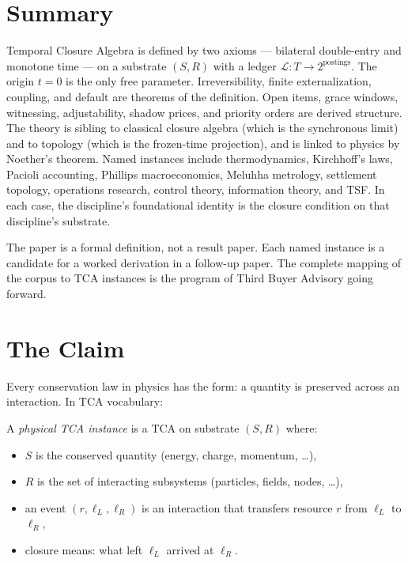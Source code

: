 \documentclass[11pt]{article}
\begin{document}
\section{Summary}

Temporal Closure Algebra is defined by two axioms — bilateral double-entry and monotone time — on a substrate $(S, R)$ with a ledger $\mathcal{L}: T \to 2^{\text{postings}}$. The origin $t = 0$ is the only free parameter. Irreversibility, finite externalization, coupling, and default are theorems of the definition. Open items, grace windows, witnessing, adjustability, shadow prices, and priority orders are derived structure. The theory is sibling to classical closure algebra (which is the synchronous limit) and to topology (which is the frozen-time projection), and is linked to physics by Noether's theorem. Named instances include thermodynamics, Kirchhoff's laws, Pacioli accounting, Phillips macroeconomics, Meluhha metrology, settlement topology, operations research, control theory, information theory, and TSF. In each case, the discipline's foundational identity is the closure condition on that discipline's substrate.

The paper is a formal definition, not a result paper. Each named instance is a candidate for a worked derivation in a follow-up paper. The complete mapping of the corpus to TCA instances is the program of Third Buyer Advisory going forward.

\clearpage
\appendix


\section{The Claim}

Every conservation law in physics has the form: a quantity is
preserved across an interaction. In TCA vocabulary:

\begin{definition}
A \emph{physical TCA instance} is a TCA on substrate $(S, R)$ where:
\begin{itemize}[leftmargin=2em]
\item $S$ is the conserved quantity (energy, charge, momentum, \ldots),
\item $R$ is the set of interacting subsystems (particles, fields,
  nodes, \ldots),
\item an event $(r, \ell_L, \ell_R)$ is an interaction that transfers
  resource $r$ from $\ell_L$ to $\ell_R$,
\item closure means: what left $\ell_L$ arrived at $\ell_R$.
\end{itemize}
\end{definition}
\end{document}
